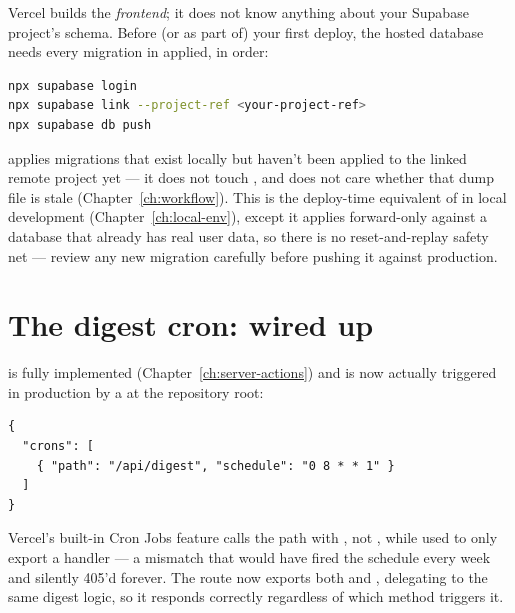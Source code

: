 Vercel builds the \emph{frontend}; it does not know anything about your Supabase project's schema. Before (or as part of) your first deploy, the hosted database needs every migration in  applied, in order:

\begin{lstlisting}[style=olkcodebash, language=bash, caption={Linking to and migrating the hosted project (run once per new migration batch)}]
npx supabase login
npx supabase link --project-ref <your-project-ref>
npx supabase db push
\end{lstlisting}

\begin{olknote}
 applies migrations that exist locally but haven't been applied to the linked remote project yet — it does not touch , and does not care whether that dump file is stale (Chapter~\ref{ch:workflow}). This is the deploy-time equivalent of  in local development (Chapter~\ref{ch:local-env}), except it applies forward-only against a database that already has real user data, so there is no reset-and-replay safety net — review any new migration carefully before pushing it against production.
\end{olknote}

\section{The digest cron: wired up}

 is fully implemented (Chapter~\ref{ch:server-actions}) and is now actually triggered in production by a  at the repository root:

\begin{lstlisting}[caption={vercel.json — schedules the weekly digest}]
{
  "crons": [
    { "path": "/api/digest", "schedule": "0 8 * * 1" }
  ]
}
\end{lstlisting}

\begin{olknote}
Vercel's built-in Cron Jobs feature calls the path with , not , while  used to only export a  handler — a mismatch that would have fired the schedule every week and silently 405'd forever. The route now exports both  and , delegating to the same digest logic, so it responds correctly regardless of which method triggers it.
\end{olknote}

